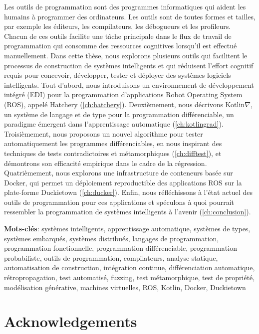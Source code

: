 \vspace{-40pt} Les outils de programmation sont des programmes informatiques qui aident les humains \`a programmer des ordinateurs. Les outils sont de toutes formes et tailles, par exemple les \'editeurs, les compilateurs, les d\'ebogueurs et les profileurs. Chacun de ces outils facilite une t\^ache principale dans le flux de travail de programmation qui consomme des ressources cognitives lorsqu'il est effectu\'e manuellement. Dans cette th\`ese, nous explorons plusieurs outils qui facilitent le processus de construction de syst\`emes intelligents et qui r\'eduisent l'effort cognitif requis pour concevoir, d\'evelopper, tester et d\'eployer des syst\`emes logiciels intelligents. Tout d'abord, nous introduisons un environnement de d\'eveloppement int\'egr\'e (EDI) pour la programmation d'applications Robot Operating System (ROS), appel\'e Hatchery (\autoref{ch:hatchery}). Deuxi\`emement, nous d\'ecrivons Kotlin$\nabla$, un syst\`eme de langage et de type pour la programmation diff\'erenciable, un paradigme \'emergent dans l'apprentissage automatique (\autoref{ch:kotlingrad}). Troisi\`emement, nous proposons un nouvel algorithme pour tester automatiquement les programmes diff\'erenciables, en nous inspirant des techniques de tests contradictoires et m\'etamorphiques (\autoref{ch:difftest}), et d\'emontrons son efficacit\'e empirique dans le cadre de la r\'egression. Quatri\`emement, nous explorons une infrastructure de conteneurs bas\'ee sur Docker, qui permet un d\'eploiement reproductible des applications ROS sur la plate-forme Duckietown (\autoref{ch:ducker}). Enfin, nous r\'efl\'echissons \`a l'\'etat actuel des outils de programmation pour ces applications et sp\'eculons \`a quoi pourrait ressembler la programmation de syst\`emes intelligents \`a l'avenir (\autoref{ch:conclusion}).

\noindent\textbf{Mots-cl\'es}: syst\`emes intelligents, apprentissage automatique, syst\`emes de types, syst\`emes embarqu\'es, syst\`emes distribu\'es, langages de programmation, programmation fonctionnelle, programmation diff\'erenciable, programmation probabiliste, outils de programmation, compilateurs, analyse statique, automatisation de construction, int\'egration continue, diff\'erenciation automatique, r\'etropropagation, test automatis\'e, fuzzing, test m\'etamorphique, test de propri\'et\'e, mod\'elisation g\'en\'erative, machines virtuelles, ROS, Kotlin, Docker, Duckietown

\chapter*{Acknowledgements}

